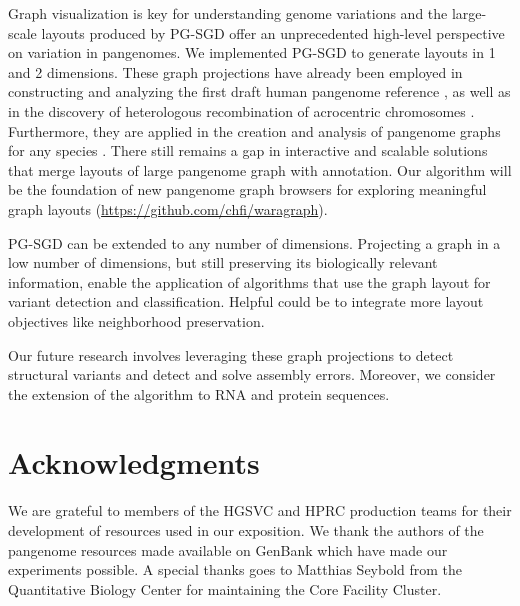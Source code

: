 \documentclass{bioinfo}
\theoremstyle{definition}
\begin{document}
	Graph visualization is key for understanding genome variations and the large-scale layouts produced by PG-SGD offer an unprecedented high-level perspective on variation in pangenomes.
	We implemented PG-SGD to generate layouts in 1 and 2 dimensions.
	These graph projections have already been employed in constructing and analyzing the first draft human pangenome reference \citep{Liao2023}, as well as in the discovery of heterologous recombination of acrocentric chromosomes \citep{Guarracino2023}.
	Furthermore, they are applied in the creation and analysis of pangenome graphs for any species \citep{Guarracino2022, Garrison2023}.
	There still remains a gap in interactive and scalable solutions that merge layouts of large pangenome graph with annotation.
	Our algorithm will be the foundation of new pangenome graph browsers for exploring meaningful graph layouts (\href{https://github.com/chfi/waragraph}{https://github.com/chfi/waragraph}).
	
	PG-SGD can be extended to any number of dimensions.
	Projecting a graph in a low number of dimensions, but still preserving its biologically relevant information, enable the application of algorithms that use the graph layout for variant detection and classification. 
	Helpful could be to integrate more layout objectives \citep{ahmed_multicriteria_2021} like neighborhood preservation.
	
	Our future research involves leveraging these graph projections to detect structural variants and detect and solve assembly errors.
	Moreover, we consider the extension of the algorithm to RNA and protein sequences.
	
	\section*{Acknowledgments}
	
	We are grateful to members of the HGSVC and HPRC production teams for their development of resources used in our exposition.
	We thank the authors of the pangenome resources made available on GenBank which have made our experiments possible.
	A special thanks goes to Matthias Seybold from the Quantitative Biology Center for maintaining the Core Facility Cluster.
	
\end{document}
